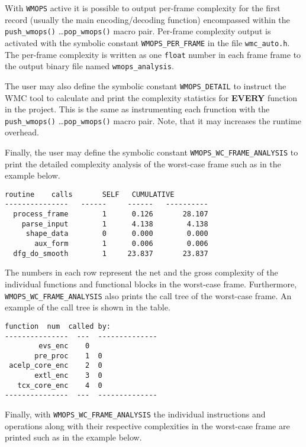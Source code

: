 With \verb|WMOPS| active it is possible to output per-frame complexity for the first record (usually the main encoding/decoding function) encompassed within the \verb|push_wmops()| \ldots \verb|pop_wmops()| macro pair. Per-frame complexity output is activated with the symbolic constant \verb|WMOPS_PER_FRAME| in the file \verb|wmc_auto.h|. The per-frame complexity is written as one \verb|float| number in each frame frame to the output binary file named \verb|wmops_analysis|. 

The user may also define the symbolic constant \verb|WMOPS_DETAIL| to instruct the WMC tool to calculate and print the complexity statistics for \textbf{EVERY} function in the project. This is the same as instrumenting each frunction with the \verb|push_wmops()| \ldots \verb|pop_wmops()| macro pair. Note, that it may increases the runtime overhead. 

Finally, the user may define the symbolic constant \verb|WMOPS_WC_FRAME_ANALYSIS| to print the detailed complexity analysis of the worst-case frame such as in the example below. 

\begin{Verbatim}[fontsize=\small]
        routine    calls       SELF   CUMULATIVE
---------------   ------     ------   ----------
  process_frame        1      0.126       28.107
    parse_input        1      4.138        4.138
     shape_data        0      0.000        0.000
       aux_form        1      0.006        0.006
  dfg_do_smooth        1     23.837       23.837
\end{Verbatim}

The numbers in each row represent the net and the gross complexity of the individual functions and functional blocks in the worst-case frame. Furthermore, \verb|WMOPS_WC_FRAME_ANALYSIS| also prints the call tree of the worst-case frame. An example of the call tree is shown in the table.

\begin{Verbatim}[fontsize=\small]
       function  num  called by:
---------------  ---  --------------
        evs_enc    0
       pre_proc    1  0
 acelp_core_enc    2  0
       extl_enc    3  0
   tcx_core_enc    4  0
---------------  ---  --------------
\end{Verbatim}

Finally, with \verb|WMOPS_WC_FRAME_ANALYSIS| the individual instructions and operations along with their respective complexities in the worst-case frame are printed such as in the example below.

